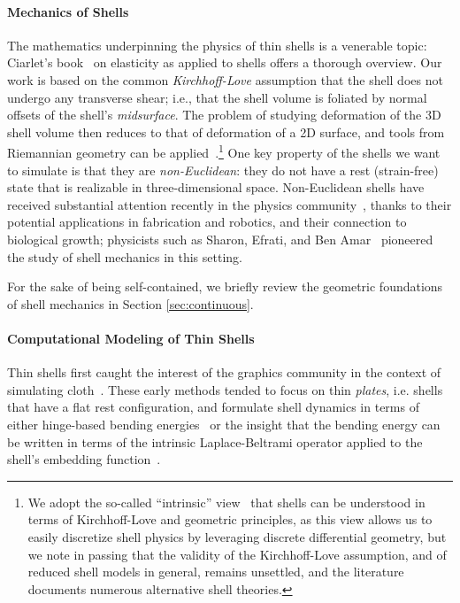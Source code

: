 \documentclass[timestamp,acmtog]{acmart}
\begin{document}
\paragraph{Mechanics of Shells}
The mathematics underpinning the physics of thin shells is a venerable topic: Ciarlet's book~ on elasticity as applied to shells offers a thorough overview. Our work is based on the common \emph{Kirchhoff-Love} assumption that the shell does not undergo any transverse shear; i.e., that the shell volume is foliated by normal offsets of the shell's \emph{midsurface}. The problem of studying deformation of the 3D shell volume then reduces to that of deformation of a 2D surface, and tools from Riemannian geometry can be applied~\cite{Simo1989}.\footnote{We adopt the so-called ``intrinsic'' view~\cite{Neff2004} that shells can be understood in terms of Kirchhoff-Love and geometric principles, as this view allows us to easily discretize shell physics by leveraging discrete differential geometry, but we note in passing that the validity of the Kirchhoff-Love assumption, and of reduced shell models in general, remains unsettled, and the literature documents numerous alternative shell theories.} One key property of the shells we want to simulate is that they are \emph{non-Euclidean}: they do not have a rest (strain-free) state that is realizable in three-dimensional space. Non-Euclidean shells have received substantial attention recently in the physics community~\cite{Klein2007,Kim2012}, thanks to their potential applications in fabrication and robotics, and their connection to biological growth; physicists such as Sharon, Efrati, and Ben Amar~\cite{Goriely2005, Dervaux2008,Efrati2009,Sharon2010} pioneered the study of shell mechanics in this setting.

For the sake of being self-contained, we briefly review the geometric foundations of shell mechanics in Section \ref{sec:continuous}.

\paragraph{Computational Modeling of Thin Shells} 
Thin shells first caught the interest of the graphics community in the context of simulating cloth~\cite{Baraff1998,Bridson2002}. These early methods tended to focus on thin \emph{plates}, i.e. shells that have a flat rest configuration, and formulate shell dynamics in terms of either hinge-based bending energies~\cite{Sullivan2008,Tamstorf2013} or the insight that the bending energy can be written in terms of the intrinsic Laplace-Beltrami operator applied to the shell's embedding function~\cite{Bobenko2005,Bergou2006,Wardetzky2007}. 
\end{document}
